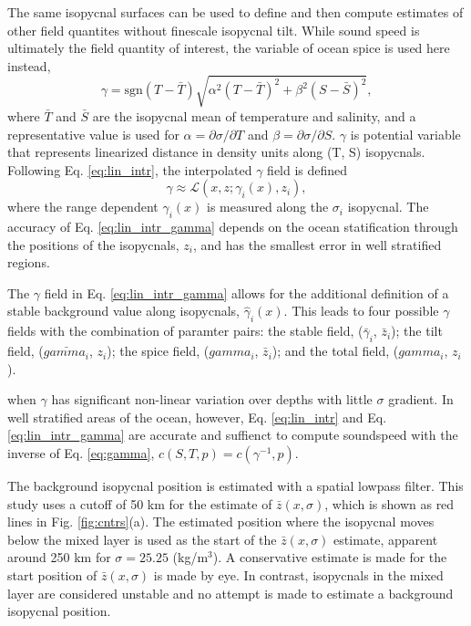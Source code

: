 \documentclass[preprint]{JASA}
\begin{document}
The same isopycnal surfaces can be used to define and then compute estimates of other field quantites without finescale isopycnal tilt. While sound speed is ultimately the field quantity of interest, the variable of ocean spice is used here instead,
\begin{equation}
    \gamma=\textrm{sgn}(T-\bar{T}) \sqrt{\alpha^2(T-\bar{T})^2 +\beta^2(S-\bar{S})^2},
    \label{eq:gamma}
\end{equation}
where $\bar{T}$ and $\bar{S}$ are the isopycnal mean of temperature and salinity, and a representative value is used for $\alpha=\partial \sigma / \partial T$ and $\beta=\partial \sigma / \partial S$. $\gamma$ is potential variable that represents linearized distance in density units along (T, S) isopycnals. Following Eq. \eqref{eq:lin_intr}, the interpolated $\gamma$ field is defined
\begin{equation}
    \gamma\approx\mathcal{L}(x, z; \gamma_i(x), z_i),
    \label{eq:lin_intr_gamma}
\end{equation}
where the range dependent $\gamma_i(x)$ is measured along the $\sigma_i$ isopycnal. The accuracy of Eq. \eqref{eq:lin_intr_gamma} depends on the ocean statification through the positions of the isopycnals, $z_i$, and has the smallest error in well stratified regions.

The $\gamma$ field in Eq. \eqref{eq:lin_intr_gamma} allows for the additional definition of a stable background value along isopycnals, $\hat{\gamma}_i(x)$. This leads to four possible $\gamma$ fields with the combination of paramter pairs: the stable field, ($\bar{\gamma}_i$, $\bar{z}_i$); the tilt field, ($\bar{gamma_i}$, $z_i$); the spice field, ($gamma_i$, $\bar{z}_i$); and the total field, ($gamma_i$, $z_i$).

when $\gamma$ has significant non-linear variation over depths with little $\sigma$ gradient. In well stratified areas of the ocean, however, Eq. \ref{eq:lin_intr} and Eq. \ref{eq:lin_intr_gamma} are accurate and suffienct to compute soundspeed with the inverse of Eq. \eqref{eq:gamma}, $c(S, T, p)=c(\gamma^{-1}, p)$.

 The background isopycnal position is estimated with a spatial lowpass filter. This study uses a cutoff of 50 km for the estimate of $\bar{z}(x, \sigma)$, which is shown as red lines in Fig. \ref{fig:cntrs}(a). The estimated position where the isopycnal moves below the mixed layer is used as the start of the $\bar{z}(x, \sigma)$ estimate, apparent around 250 km for $\sigma=25.25$ (kg/m$^3$). A conservative estimate is made for the start position of $\bar{z}(x, \sigma)$ is made by eye. In contrast, isopycnals in the mixed layer are considered unstable and no attempt is made to estimate a background isopycnal position.
\end{document}
